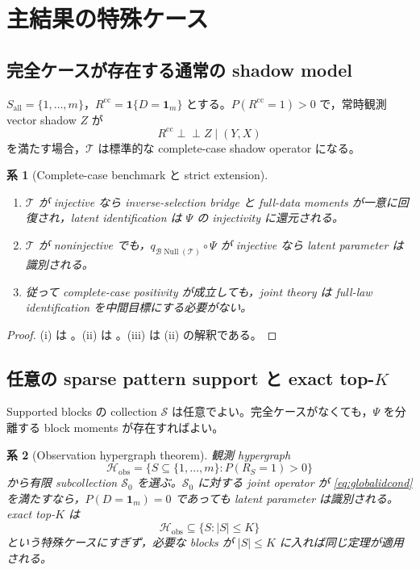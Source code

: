 \documentclass[11pt,a4paper]{ltjsarticle}
\newtheorem{corollary}{系}[section]
\theoremstyle{remark}
\newcommand{\ind}{\perp\!\!\!\perp}
\newcommand{\one}{\bm 1}
\newcommand{\cH}{\mathcal H}
\newcommand{\cS}{\mathcal S}
\newcommand{\Top}{\mathscr T}
\newcommand{\Bop}{\mathscr B}
\newcommand{\Null}{\operatorname{Null}}
\begin{document}
\section{主結果の特殊ケース}\label{sec:special}

\subsection{完全ケースが存在する通常の shadow model}
$S_\mathrm{all}=\{1,\ldots,m\}$，$R^{\mathrm{cc}}=\one\{D=\one_m\}$ とする。$P(R^{\mathrm{cc}}=1)>0$ で，常時観測 vector shadow $Z$ が
\[
R^{\mathrm{cc}}\ind Z\mid(Y,X)
\]
を満たす場合，$\Top$ は標準的な complete-case shadow operator になる。

\begin{corollary}[Complete-case benchmark と strict extension]\label{cor:completecase}
\begin{enumerate}[label=(\roman*)]
\item $\Top$ が injective なら inverse-selection bridge と full-data moments が一意に回復され，latent identification は $\Psi$ の injectivity に還元される。
\item $\Top$ が noninjective でも，$q_{\Bop\Null(\Top)}\circ\Psi$ が injective なら latent parameter は識別される。
\item 従って complete-case positivity が成立しても，joint theory は full-law identification を中間目標にする必要がない。
\end{enumerate}
\end{corollary}

\begin{proof}
(i) は 。(ii) は 。(iii) は (ii) の解釈である。
\end{proof}

\subsection{任意の sparse pattern support と \texorpdfstring{exact top-$K$}{exact top-K}}
Supported blocks の collection $\cS$ は任意でよい。完全ケースがなくても，$\Psi$ を分離する block moments が存在すればよい。

\begin{corollary}[Observation hypergraph theorem]\label{cor:hypergraph}
観測 hypergraph
\[
\cH_{\mathrm{obs}}
=\{S\subseteq\{1,\ldots,m\}:P(R_S=1)>0\}
\]
から有限 subcollection $\cS_0$ を選ぶ。$\cS_0$ に対する joint operator が \eqref{eq:globalidcond} を満たすなら，$P(D=\one_m)=0$ であっても latent parameter は識別される。exact top-$K$ は
\[
\cH_{\mathrm{obs}}\subseteq\{S:|S|\le K\}
\]
という特殊ケースにすぎず，必要な blocks が $|S|\le K$ に入れば同じ定理が適用される。
\end{corollary}
\end{document}
